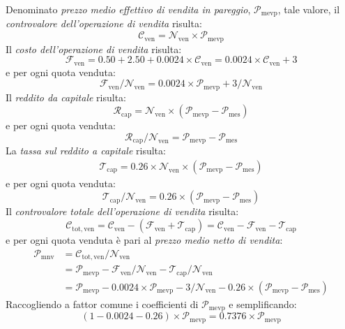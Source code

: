 \documentclass[12pt,a4paper]{article}
\newcommand{\CalcoloCostoOperazioneSim}[1]{\num{0,50} + \num{2,50} + \num{0,0024} \times{} #1}
\newcommand{\Nven}[1]{\mathcal{N}_{\textrm{ven}#1}}
\newcommand{\Pme}[1]{\mathcal{P}_{\mathrm{me}#1}}
\newcommand{\Pmes}[1]{\Pme{\mathrm{s}#1}}
\newcommand{\Pmnv}[1]{\mathcal{P}_{\mathrm{mnv}#1}}
\newcommand{\Pmevp}[1]{\mathcal{P}_{\mathrm{mevp}#1}}
\newcommand{\Cven}[1]{\mathcal{C}_{\mathrm{ven}#1}}
\newcommand{\Ctotven}[1]{\mathcal{C}_{\mathrm{tot,ven}#1}}
\newcommand{\Rcap}[1]{\mathcal{R}_{\mathrm{cap}#1}}
\newcommand{\Tredcap}[1]{\mathcal{T}_{\mathrm{cap}#1}}
\newcommand{\Fven}[1]{\mathcal{F}_{\mathrm{ven}#1}}
\begin{document}
Denominato  \emph{prezzo medio  effettivo di  vendita in  pareggio}, \(\Pmevp{}\),  tale valore,  il
\emph{controvalore dell'operazione di vendita} risulta:
\begin{equation*}
  \Cven{} = \Nven{} \times{} \Pmevp{}
\end{equation*}
Il \emph{costo dell'operazione di vendita} risulta:
\begin{equation*}
  \Fven{}
  = \CalcoloCostoOperazioneSim{\Cven{}}
  = \num{0,0024} \times{} \Cven{} + \num{3}
\end{equation*}
e per ogni quota venduta:
\begin{equation*}
  \Fven{} / \Nven{}
  = \num{0,0024} \times{} \Pmevp{} + \num{3} / \Nven{}
\end{equation*}
Il \emph{reddito da capitale} risulta:
\begin{equation*}
  \Rcap{}
  = \Nven{} \times{} \left(\Pmevp{} - \Pmes{}\right)
\end{equation*}
e per ogni quota venduta:
\begin{equation*}
  \Rcap{} / \Nven{} = \Pmevp{} - \Pmes{}
\end{equation*}
La \emph{tassa sul reddito a capitale} risulta:
\begin{align*}
  \Tredcap{} = \num{0,26} \times{} \Nven{} \times{} \left(\Pmevp{} - \Pmes{}\right)
\end{align*}
e per ogni quota venduta:
\begin{equation*}
  \Tredcap{} / \Nven{}
  = \num{0,26} \times{} \left(\Pmevp{} - \Pmes{}\right)
\end{equation*}
Il \emph{controvalore totale dell'operazione di vendita} risulta:
\begin{equation*}
  \Ctotven{}
  = \Cven{} - \left( \Fven{} + \Tredcap{} \right) =  \Cven{} - \Fven{} - \Tredcap{}
\end{equation*}
e per ogni quota venduta è pari al \emph{prezzo medio netto di vendita}:
\begin{align*}
  \Pmnv{}
  &= \Ctotven{} / \Nven{}
  \\
  &= \Pmevp{} - \Fven{} / \Nven{} - \Tredcap{} / \Nven{}
    \\
  &= \Pmevp{}
    - \num{0,0024} \times{} \Pmevp{} - \num{3} / \Nven{}
    - \num{0,26} \times{} \left(\Pmevp{} - \Pmes{}\right)
\end{align*}
Raccogliendo a fattor comune i coefficienti di \(\Pmevp{}\) e semplificando:
\begin{equation*}
  \left( 1 - \num{0,0024} - \num{0,26} \right) \times{} \Pmevp{}
  = \num{0,7376} \times{} \Pmevp{}
\end{equation*}
\end{document}
